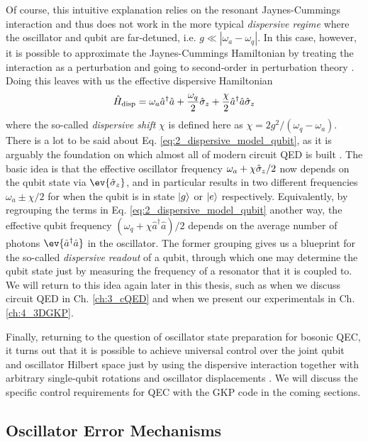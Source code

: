 Of course, this intuitive explanation relies on the resonant Jaynes-Cummings interaction and thus does not work in the more typical \textit{dispersive regime} where the oscillator and qubit are far-detuned, i.e. $g \ll |\omega_a - \omega_q|$. In this case, however, it is possible to approximate the Jaynes-Cummings Hamiltonian by treating the interaction as a perturbation and going to second-order in perturbation theory \cite{raimond2006exploring}. Doing this leaves with us the effective dispersive Hamiltonian
\begin{equation}
    \hat{H}_{\rm disp} = \omega_a \hat{a}^\dagger\hat{a} + \frac{\omega_q}{2}\hat{\sigma}_z + \frac{\chi}{2}\hat{a}^\dagger\hat{a}\hat{\sigma}_z
    \label{eq:2_dispersive_model_qubit}
\end{equation}
where the so-called \textit{dispersive shift} $\chi$ is defined here as $\chi = 2g^2/(\omega_q - \omega_a)$. There is a lot to be said about Eq. \eqref{eq:2_dispersive_model_qubit}, as it is arguably the foundation on which almost all of modern circuit QED is built \cite{blais2004cavity}. The basic idea is that the effective oscillator frequency $\omega_a + \chi\hat{\sigma}_z/2$ now depends on the qubit state via $\ev{\sigmaz}$, and in particular results in two different frequencies $\omega_a \pm \chi/2$ for when the qubit is in state $\lvert g\rangle$ or $\lvert e\rangle$ respectively. Equivalently, by regrouping the terms in Eq. \eqref{eq:2_dispersive_model_qubit} another way, the effective qubit frequency $(\omega_q + \chi \hat{a}^\dagger\hat{a})/2$ depends on the average number of photons $\ev{\hat{a}^\dagger\hat{a}}$ in the oscillator. The former grouping gives us a blueprint for the so-called \textit{dispersive readout} of a qubit, through which one may determine the qubit state just by measuring the frequency of a resonator that it is coupled to. We will return to this idea again later in this thesis, such as when we discuss circuit QED in Ch. \ref{ch:3_cQED} and when we present our experimentals in Ch. \ref{ch:4_3DGKP}. 

Finally, returning to the question of oscillator state preparation for bosonic QEC, it turns out that it is possible to achieve universal control over the joint qubit and oscillator Hilbert space just by using the dispersive interaction together with arbitrary single-qubit rotations and oscillator displacements \cite{vlastakis2015controlling, reinhold2019controlling, eickbusch2022fast}. We will discuss the specific control requirements for QEC with the GKP code in the coming sections. 

\subsection{Oscillator Error Mechanisms}

